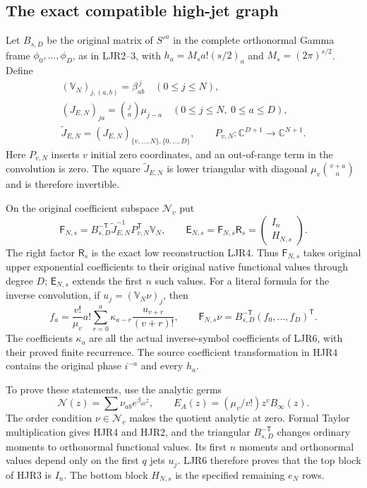 \documentclass[11pt,a4paper]{article}
\begin{document}
\subsection{The exact compatible high-jet graph}

Let $B_{s,D}$ be the original matrix of $S'^a$ in the complete
orthonormal Gamma frame $\phi_0,\ldots,\phi_D$, as in LJR2--3,
with $h_a=M_sa!(s/2)_a$ and $M_s=(2\pi)^{s/2}$. Define
\[
 \begin{gathered}
 (\mathbb V_N)_{j,(a,b)}=\beta_{ab}^{\,j}
                      \quad(0\le j\le N),\\
 (J_{E,N})_{ja}=\binom ja\mu_{j-a}
                 \quad(0\le j\le N,\ 0\le a\le D),\\
 \widetilde J_{E,N}=(J_{E,N})_{\{v,\ldots,N\},\{0,\ldots,D\}},
 \qquad P_{v,N}:\mathbb C^{D+1}\longrightarrow\mathbb C^{N+1}.
 \end{gathered}\tag{HJR2}
\]
Here $P_{v,N}$ inserts $v$ initial zero coordinates, and an
out-of-range term in the convolution is zero. The square
$\widetilde J_{E,N}$ is lower triangular with diagonal
$\mu_v\binom{v+a}{a}$ and is therefore invertible.

On the original coefficient subspace $\mathscr N_v$ put
\[
 \mathsf F_{N,s}
  =B_{s,D}^{-\mathsf T}\widetilde J_{E,N}^{-1}
                P_{v,N}^{\mathsf T}\mathbb V_N,\qquad
 \mathsf E_{N,s}=\mathsf F_{N,s}\mathsf R_s
                  =\begin{pmatrix}I_n\\ H_{N,s}\end{pmatrix}.
 \tag{HJR3}
\]
The right factor $\mathsf R_s$ is the exact low reconstruction
LJR4. Thus $\mathsf F_{N,s}$ takes original upper exponential
coefficients to their original native functional values through
degree $D$; $\mathsf E_{N,s}$ extends the first $n$ such values.
For a literal formula for the inverse convolution, if
$u_j=(\mathbb V_N\nu)_j$, then
\[
 f_a=\frac{v!}{\mu_v}a!
       \sum_{r=0}^{a}\kappa_{a-r}\frac{u_{v+r}}{(v+r)!},
 \qquad
 \mathsf F_{N,s}\nu=B_{s,D}^{-\mathsf T}(f_0,\ldots,f_D)^{\mathsf T}.
 \tag{HJR4}
\]
The coefficients $\kappa_a$ are all the actual inverse-symbol
coefficients of LJR6, with their proved finite recurrence.
The source coefficient transformation in HJR4 contains the
original phase $i^{-a}$ and every $h_a$.

To prove these statements, use the analytic germs
\[
 \mathcal N(z)=\sum\nu_{ab}e^{\beta_{ab}z},\qquad
 E_A(z)=(\mu_v/v!)z^vB_\infty(z).
\]
The order condition
$\nu\in\mathscr N_v$ makes the quotient analytic at zero.
Formal Taylor multiplication gives HJR4 and HJR2, and the
triangular $B_{s,D}^{-\mathsf T}$ changes ordinary moments to
orthonormal functional values. Its first $n$ moments and
orthonormal values depend only on the first $q$ jets $u_j$.
LJR6 therefore proves that the top block of HJR3 is $I_n$.
The bottom block $H_{N,s}$ is the specified remaining $e_N$ rows.
\end{document}

